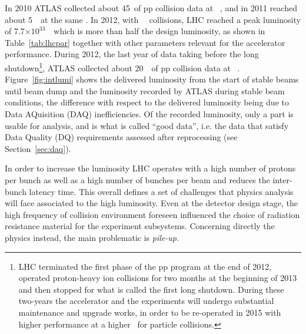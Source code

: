 In 2010 ATLAS collected about 45~\ipb of pp collision data at ~\tev, and in
2011 reached about 5~\ifb\ at the same \cme.
In 2012, with  ~\tev\ collisions, LHC reached a peak luminosity of 7.7$\times10^{33}$~\ which is
more than half the design luminosity, as shown in Table~\ref{tab:lhcpar} together
with other parameters relevant for the accelerator performance. 
During 2012, the last
year of data taking before the long shutdown\footnote{LHC terminated the first phase of the pp program
at the end of 2012, operated proton-heavy ion collisions for two months at the beginning
of 2013 and then stopped for what is called the first long shutdown. During these two-years
the accelerator and the experiments will undergo substantial maintenance and 
upgrade works, in order to be re-operated in 2015 with higher performance at a higher
\cme\ for particle collisions.},
ATLAS collected about 20~\ifb\ of pp collision data at ~\tev.
Figure~\ref{fig:intlumi} shows the delivered luminosity from the start of stable beams until beam dump and the luminosity recorded by
ATLAS during stable beam conditions, the difference with respect to the delivered luminosity being due to Data AQuisition (DAQ)
inefficiencies. Of the recorded luminosity, only a part is usable for analysis, and is what is called ``good data'', i.e. 
the data that satisfy Data Quality (DQ) requirements assessed after reprocessing (see Section~\ref{sec:daq}).

In order to increase the luminosity LHC operates with a high number of protons per bunch as well as a high
 number of bunches per beam and reduces the inter-bunch latency time.
This overall defines a set of challenges that physics analysis will face associated to the high luminosity.
Even at the detector design stage, the high frequency of collision environment foreseen influenced
the choice of radiation resistance material for the experiment subsystems. Concerning directly the physics
instead, the main problematic is \textit{pile-up}.

